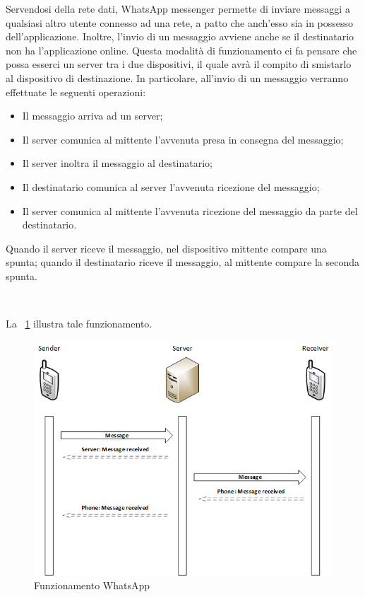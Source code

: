 \documentclass[a4paper,11pt]{book}
\begin{document}
Servendosi della rete dati, WhatsApp messenger permette di inviare messaggi a qualsiasi altro utente connesso ad una rete, a patto che anch'esso sia in possesso dell'applicazione. Inoltre, l'invio di un messaggio avviene anche se il destinatario non ha l'applicazione online. Questa modalit\`a di funzionamento ci fa pensare che possa esserci un server tra i due dispositivi, il quale avr\`a il compito di smistarlo al dispositivo di destinazione.
In particolare, all'invio di un messaggio verranno effettuate le seguenti operazioni:
\begin{itemize}
 \item Il messaggio arriva ad un server;
 \item Il server comunica al mittente l'avvenuta presa in consegna del messaggio;
 \item Il server inoltra il messaggio al destinatario;
 \item Il destinatario comunica al server l'avvenuta ricezione del messaggio;
 \item Il server comunica al mittente l'avvenuta ricezione del messaggio da parte del destinatario.
\end{itemize}

Quando il server riceve il messaggio, nel dispositivo mittente compare una spunta; quando il destinatario riceve il messaggio, al mittente compare la seconda spunta.

~

La \figurename ~\ref{fig:WhatsApp} illustra tale funzionamento.
~
\begin{figure}[h!t]
\centering
\includegraphics[scale = 0.8]{rete}
\caption{Funzionamento WhatsApp}
\label{fig:WhatsApp}
\end{figure}
\end{document}
